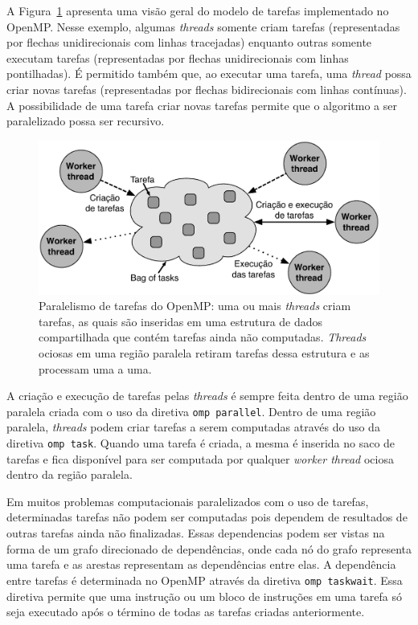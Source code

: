 \documentclass{SBCbookchapter}
\begin{document}
	A Figura~\ref{fig:tasks} apresenta uma visão geral do modelo de tarefas implementado
	no OpenMP. Nesse exemplo, algumas \textit{threads} somente criam tarefas (representadas
	por flechas unidirecionais com linhas tracejadas) enquanto outras somente executam tarefas
	(representadas por flechas unidirecionais com linhas pontilhadas). É permitido também que,
	ao executar uma tarefa, uma \textit{thread} possa criar novas tarefas (representadas por
	flechas bidirecionais com linhas contínuas). A possibilidade de uma tarefa criar novas tarefas
	permite que o algoritmo a ser paralelizado possa ser recursivo.
	
		\begin{figure}[t]
			\centering
			\includegraphics[width=0.6\linewidth]{img/tasks}
			\caption{Paralelismo de tarefas do OpenMP: uma ou mais \textit{threads} criam
			tarefas, as quais são inseridas em uma estrutura de dados compartilhada
			que contém tarefas ainda não computadas. \textit{Threads} ociosas em
			uma região paralela retiram tarefas dessa estrutura e as processam uma a
			uma.}
			\label{fig:tasks}
		\end{figure}

	A criação e execução de tarefas pelas \textit{threads} é sempre feita dentro de uma região paralela
	criada com o uso da diretiva \texttt{omp parallel}. Dentro de uma região paralela, \textit{threads} podem
	criar tarefas a serem computadas através do uso da diretiva \texttt{omp task}. Quando uma tarefa é criada,
	a mesma é inserida no saco de tarefas e fica disponível para ser computada por qualquer \textit{worker thread}
	ociosa dentro da região paralela.

	Em muitos problemas computacionais paralelizados com o uso de tarefas, determinadas tarefas não podem
	ser computadas pois dependem de resultados de outras tarefas ainda não finalizadas. Essas dependencias
	podem ser vistas na forma de um grafo direcionado de dependências, onde cada nó do grafo representa
	uma tarefa e as arestas representam as dependências entre elas. A dependência entre tarefas é determinada
	no OpenMP através da diretiva \texttt{omp taskwait}. Essa diretiva permite que uma instrução ou um bloco de
	instruções em uma tarefa só seja executado após o término de todas as tarefas criadas anteriormente.
	
\end{document}
